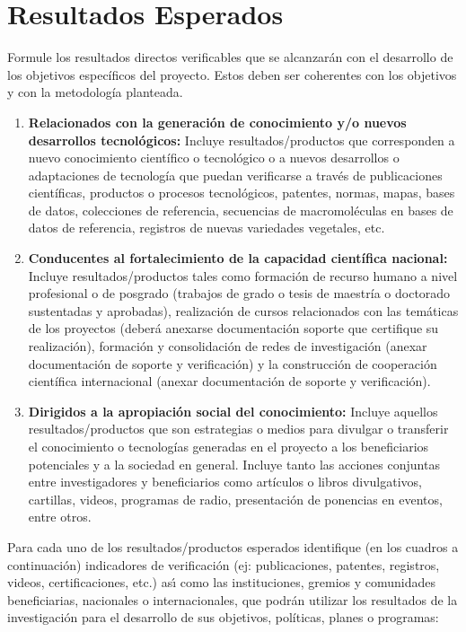 \section{ Resultados Esperados }
\begin{instrucciones}
  Formule los resultados directos verificables que se
alcanzarán con el desarrollo de los objetivos específicos del proyecto. Estos deben ser coherentes
con los objetivos y con la metodología planteada.


  \begin{enumerate}
  \item \textbf{Relacionados con la generación de conocimiento y/o nuevos desarrollos
 tecnológicos:} Incluye resultados/productos que corresponden a nuevo
 conocimiento científico o tecnológico o a nuevos desarrollos o adaptaciones de
 tecnología que puedan verificarse a través de publicaciones científicas,
 productos o procesos tecnológicos, patentes, normas, mapas, bases de datos,
 colecciones de referencia, secuencias de macromoléculas en bases de datos de
 referencia, registros de nuevas variedades vegetales, etc.
\item \textbf{Conducentes al fortalecimiento de la capacidad científica
  nacional:} Incluye resultados/productos tales como formación de
  recurso humano a nivel profesional o de posgrado (trabajos de grado
  o tesis de maestría o doctorado sustentadas y aprobadas),
  realización de cursos relacionados con las temáticas de los
  proyectos (deberá anexarse documentación soporte que certifique su
  realización), formación y consolidación de redes de investigación
  (anexar documentación de soporte y verificación) y la construcción
  de cooperación científica internacional (anexar documentación de
  soporte y verificación).
\item \textbf{Dirigidos a la apropiación social del conocimiento:}
  Incluye aquellos resultados/productos que son estrategias o medios
  para divulgar o transferir el conocimiento o tecnologías generadas
  en el proyecto a los beneficiarios potenciales y a la sociedad en
  general. Incluye tanto las acciones conjuntas entre investigadores y
  beneficiarios como artículos o libros divulgativos, cartillas,
  videos, programas de radio, presentación de ponencias en eventos,
  entre otros.
  \end{enumerate}

  Para cada uno de los resultados/productos esperados identifique (en
  los cuadros a continuación) indicadores de verificación (ej:
  publicaciones, patentes, registros, videos, certificaciones, etc.)
  as\'\i{} como las instituciones, gremios y comunidades beneficiarias,
  nacionales o internacionales, que podrán utilizar los resultados de
  la investigación para el desarrollo de sus objetivos, políticas,
  planes o programas:

\end{instrucciones}

